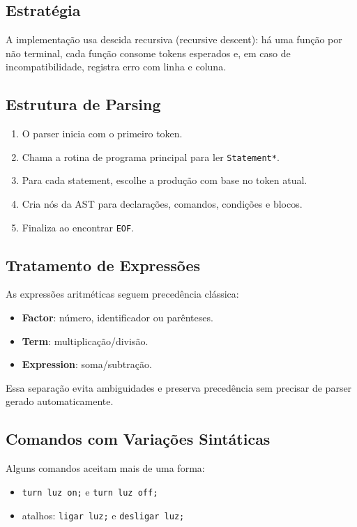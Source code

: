 \documentclass[12pt,a4paper]{article}
\begin{document}
\subsection{Estratégia}
A implementação usa descida recursiva (recursive descent): há uma função por não terminal, cada função consome tokens esperados e, em caso de incompatibilidade, registra erro com linha e coluna.

\subsection{Estrutura de Parsing}
\begin{enumerate}[label=\arabic*.]
  \item O parser inicia com o primeiro token.
  \item Chama a rotina de programa principal para ler \texttt{Statement*}.
  \item Para cada statement, escolhe a produção com base no token atual.
  \item Cria nós da AST para declarações, comandos, condições e blocos.
  \item Finaliza ao encontrar \texttt{EOF}.
\end{enumerate}

\subsection{Tratamento de Expressões}
As expressões aritméticas seguem precedência clássica:
\begin{itemize}
  \item \textbf{Factor}: número, identificador ou parênteses.
  \item \textbf{Term}: multiplicação/divisão.
  \item \textbf{Expression}: soma/subtração.
\end{itemize}

Essa separação evita ambiguidades e preserva precedência sem precisar de parser gerado automaticamente.

\subsection{Comandos com Variações Sintáticas}
Alguns comandos aceitam mais de uma forma:
\begin{itemize}
  \item \texttt{turn luz on;} e \texttt{turn luz off;}
  \item atalhos: \texttt{ligar luz;} e \texttt{desligar luz;}
\end{itemize}
\end{document}
